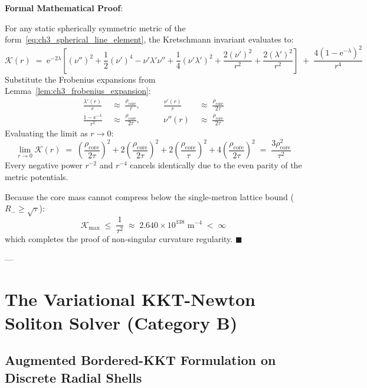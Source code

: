\documentclass[
    12pt,
    a4paper,
    headings=normal,
    twoside=false,
    open=any,
    parskip=half
]{scrbook}
\newcommand{\eu}{\mathrm{e}}
\newenvironment{myproof}[1][]{%
  \par\vspace{6pt}\noindent\textbf{\sffamily\color{maincolor}Formal Mathematical Proof\ifstrempty{#1}{}{ (#1)}}:\par\nopagebreak
}{%
  \penalty50\hfill\ensuremath{\blacksquare}\par\vspace{6pt}
}
\begin{document}
\begin{myproof}
For any static spherically symmetric metric of the form~\eqref{eq:ch3_spherical_line_element}, the Kretschmann invariant evaluates to:
\begin{equation*}
\mathcal{K}(r) \;=\; \eu^{-2\lambda} \left[ (\nu'')^2 + \frac{1}{2}(\nu')^4 - \nu'\lambda'\nu'' + \frac{1}{4}(\nu'\lambda')^2 + \frac{2(\nu')^2}{r^2} + \frac{2(\lambda')^2}{r^2} \right] \;+\; \frac{4(1 - \eu^{-\lambda})^2}{r^4}
\end{equation*}
Substitute the Frobenius expansions from Lemma~\ref{lem:ch3_frobenius_expansion}:
\begin{align*}
\frac{\lambda'(r)}{r} &\;\approx\; \frac{\rho_{\text{core}}}{\tau}, \qquad &\frac{\nu'(r)}{r} &\;\approx\; \frac{\rho_{\text{core}}}{2\tau} \\
\frac{1 - \eu^{-\lambda}}{r^2} &\;\approx\; \frac{\rho_{\text{core}}}{2\tau}, \qquad &\nu''(r) &\;\approx\; \frac{\rho_{\text{core}}}{2\tau}
\end{align*}
Evaluating the limit as $r \to 0$:
\begin{equation*}
\lim_{r \to 0} \mathcal{K}(r) \;=\; \left( \frac{\rho_{\text{core}}}{2\tau} \right)^2 + 2\left( \frac{\rho_{\text{core}}}{2\tau} \right)^2 + 2\left( \frac{\rho_{\text{core}}}{\tau} \right)^2 + 4\left( \frac{\rho_{\text{core}}}{2\tau} \right)^2 \;=\; \frac{3\rho_{\text{core}}^2}{\tau^2}
\end{equation*}
Every negative power $r^{-2}$ and $r^{-4}$ cancels identically due to the even parity of the metric potentials. 

Because the core mass cannot compress below the single-metron lattice bound ($R_- \ge \sqrt{\tau}$):
\begin{equation*}
\mathcal{K}_{\max} \;\le\; \frac{1}{\tau^2} \;\approx\; 2.640 \times 10^{138} \text{ m}^{-4} \;<\; \infty
\end{equation*}
which completes the proof of non-singular curvature regularity.
\end{myproof}

---

\section{The Variational KKT-Newton Soliton Solver (Category B)}
\label{sec:ch3_variational_kkt_solver}

\subsection{Augmented Bordered-KKT Formulation on Discrete Radial Shells}
\end{document}
